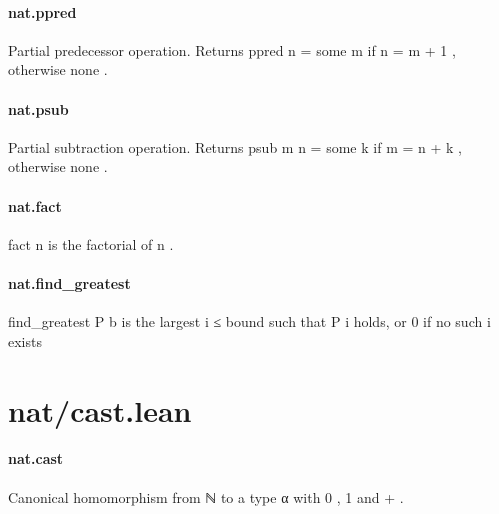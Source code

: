 \documentclass{article}
\begin{document}
\paragraph{nat.ppred}
\par
Partial predecessor operation. Returns 
\colorbox[RGB]{253,246,227}{{{{\color[RGB]{101, 123, 131} ppred n  }}}{{{\color[RGB]{181, 137, 0} = }}}{{{\color[RGB]{101, 123, 131}  some m }}}}if 
\colorbox[RGB]{253,246,227}{{{{\color[RGB]{101, 123, 131} n  }}}{{{\color[RGB]{181, 137, 0} = }}}{{{\color[RGB]{101, 123, 131}  m  }}}{{{\color[RGB]{181, 137, 0} + }}}{{{\color[RGB]{101, 123, 131}   }}}{{{\color[RGB]{108, 113, 196} 1 }}}}, otherwise 
\colorbox[RGB]{253,246,227}{{{{\color[RGB]{101, 123, 131} none }}}}.
\paragraph{nat.psub}
\par
Partial subtraction operation. Returns 
\colorbox[RGB]{253,246,227}{{{{\color[RGB]{101, 123, 131} psub m n  }}}{{{\color[RGB]{181, 137, 0} = }}}{{{\color[RGB]{101, 123, 131}  some k }}}}if 
\colorbox[RGB]{253,246,227}{{{{\color[RGB]{101, 123, 131} m  }}}{{{\color[RGB]{181, 137, 0} = }}}{{{\color[RGB]{101, 123, 131}  n  }}}{{{\color[RGB]{181, 137, 0} + }}}{{{\color[RGB]{101, 123, 131}  k }}}}, otherwise 
\colorbox[RGB]{253,246,227}{{{{\color[RGB]{101, 123, 131} none }}}}.
\paragraph{nat.fact}
\par
\colorbox[RGB]{253,246,227}{{{{\color[RGB]{101, 123, 131} fact n }}}} is the factorial of 
\colorbox[RGB]{253,246,227}{{{{\color[RGB]{101, 123, 131} n }}}}.
\paragraph{nat.find\_greatest}
\par
\colorbox[RGB]{253,246,227}{{{{\color[RGB]{101, 123, 131} find\_greatest P b }}}} is the largest 
\colorbox[RGB]{253,246,227}{{{{\color[RGB]{101, 123, 131} i  }}}{{{\color[RGB]{181, 137, 0} ≤ }}}{{{\color[RGB]{101, 123, 131}  bound }}}} such that 
\colorbox[RGB]{253,246,227}{{{{\color[RGB]{101, 123, 131} P i }}}} holds, or 
\colorbox[RGB]{253,246,227}{{{{\color[RGB]{108, 113, 196} 0 }}}} if no such 
\colorbox[RGB]{253,246,227}{{{{\color[RGB]{101, 123, 131} i }}}}exists
\section{nat/cast.lean}\paragraph{nat.cast}
\par
Canonical homomorphism from 
\colorbox[RGB]{253,246,227}{{{{\color[RGB]{101, 123, 131} ℕ }}}} to a type 
\colorbox[RGB]{253,246,227}{{{{\color[RGB]{101, 123, 131} α }}}} with 
\colorbox[RGB]{253,246,227}{{{{\color[RGB]{108, 113, 196} 0 }}}}, 
\colorbox[RGB]{253,246,227}{{{{\color[RGB]{108, 113, 196} 1 }}}} and 
\colorbox[RGB]{253,246,227}{{{{\color[RGB]{181, 137, 0} + }}}}.
\end{document}
